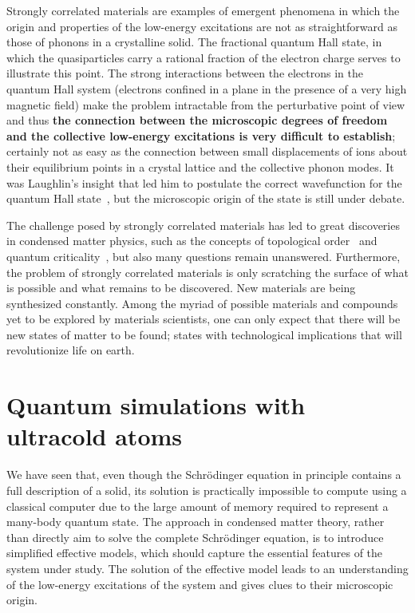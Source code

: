 \documentclass[oneside,11pt]{memoir}
\begin{document}
Strongly correlated materials are examples of emergent phenomena in which the
origin and properties of the low-energy excitations are not as straightforward
as those of phonons in a crystalline solid.  The fractional quantum Hall state,
in which the quasiparticles carry a rational fraction of the electron charge
serves to illustrate this point.  The strong interactions between the electrons
in the quantum Hall system (electrons confined in a plane in the presence of a
very high magnetic field) make the problem intractable from the perturbative
point of view and thus \textbf{the connection between the microscopic degrees
of freedom and the collective low-energy excitations is very difficult to
establish}; certainly not as easy as the connection between small displacements
of ions about their equilibrium points in a crystal lattice and the collective
phonon modes. It was Laughlin's insight that led him to postulate the correct
wavefunction  for the quantum Hall state~\cite{PhysRevLett.50.1395}, but the
microscopic origin of the state is still under debate.   

The challenge posed by strongly correlated materials has led to great
discoveries in condensed matter physics, such as the concepts of topological
order~\cite{wen1990topological} and quantum
criticality~\cite{PhysRevB.14.1165,sachdev2011quantum}, but also many questions
remain unanswered.  Furthermore, the problem of strongly correlated materials
is only scratching the surface of what is possible and what remains to be
discovered.  New materials are being synthesized constantly.  Among the
myriad of possible materials and compounds yet to be explored by
materials scientists, one can only expect that there will be new states of
matter to be found; states with technological implications that will
revolutionize life on earth.  


\section{Quantum simulations with ultracold atoms}

We have seen that, even though the Schr\"{o}dinger equation in principle
contains a full description of a solid,  its solution is practically impossible
to compute using a classical computer due to the large amount of memory
required to represent a many-body quantum state.   
The approach in condensed matter theory, rather than directly aim to solve the
complete Schr\"{o}dinger equation, is to introduce simplified effective models,
which should capture the essential features of the system under study.  The
solution of the effective model leads to an understanding of the low-energy
excitations of the system and gives clues to their microscopic origin.   
\end{document}
